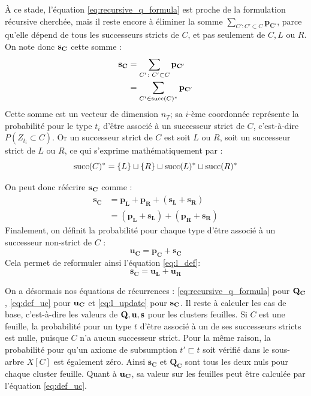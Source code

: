 À ce stade, l'équation \ref{eq:recursive_q_formula} est proche de la formulation récursive cherchée, mais il reste encore à éliminer la somme $\sum_{C' \colon C' \subset C} \mathbf{p_{C'}}$, parce qu'elle dépend de tous les successeurs stricts de $C$, et pas seulement de $C, L$ ou $R$. On note donc $\bf{s_C}$ cette somme :
\begin{align}
    \bf{s_C} &= \sum_{C' \colon C' \subset C} \mathbf{p_{C'}} \nonumber \\
            &= \sum_{C' \in \succs(C)^*} \mathbf{p_{C'}}
\end{align}
Cette somme est un vecteur de dimension $n_T$; sa $i$-ème coordonnée représente la probabilité pour le type $t_i$ d'être associé à un successeur strict de $C$, c'est-à-dire $P(Z_{t_i} \subset C)$. Or un successeur strict de $C$ est soit $L$ ou $R$, soit un successeur strict de $L$ ou $R$, ce qui s'exprime mathématiquement par :
\begin{equation}
    \succs(C)^* = \{L\} \sqcup \{R\} \sqcup \succs(L)^* \sqcup \succs(R)^*
\end{equation}

On peut donc réécrire $\bf{s_C}$ comme :
\begin{align}
    \mathbf{s_C} &= \mathbf{p_L} + \mathbf{p_R} + (\mathbf{s_L} + \mathbf{s_R}) \nonumber  \\
     &= (\mathbf{p_L}  + \mathbf{s_L}) + (\mathbf{p_R} + \mathbf{s_R})
    \label{eq:l_def}
\end{align}
Finalement, on définit la probabilité pour chaque type d'être associé à un successeur non-strict de $C$ : 
\begin{equation}
    \mathbf{u_C} = \mathbf{p_C} + \mathbf{s_C}
    \label{eq:def_uc}
\end{equation}
Cela permet de reformuler ainsi l'équation \ref{eq:l_def}:
\begin{equation}
    \mathbf{s_C} = \mathbf{u_L} + \mathbf{u_R}
    \label{eq:l_update}
\end{equation}

On a désormais nos équations de récurrences : \ref{eq:recursive_q_formula} pour $\bf{Q_C}$, \ref{eq:def_uc} pour $\bf{u_C}$ et \ref{eq:l_update} pour $\bf{s_C}$. Il reste à calculer les cas de base, c'est-à-dire les valeurs de $\bf{Q, u, s}$ pour les clusters feuilles. Si $C$ est une feuille, la probabilité pour un type $t$ d'être associé à un de ses successeurs stricts est nulle, puisque $C$ n'a aucun successeur strict. Pour la même raison, la probabilité pour qu'un axiome de subsumption $t' \sqsubset t$ soit vérifié dans le sous-arbre $X[C]$ est également zéro. Ainsi $\mathbf{s_C}$ et $\mathbf{Q_C}$ sont tous les deux nuls pour chaque cluster feuille. Quant à $\bf{u_C}$, sa valeur sur les feuilles peut être calculée par l'équation \ref{eq:def_uc}.

